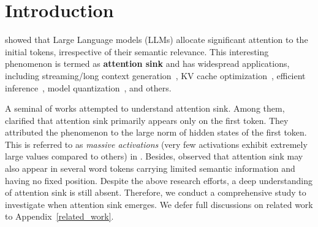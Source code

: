 \section{Introduction}



\citet{xiao2023efficient} showed that Large Language models (LLMs) allocate significant attention to the initial tokens, irrespective of their semantic relevance. This interesting phenomenon is termed as \textbf{attention sink} and has widespread applications, including streaming/long context generation~\citep{xiao2023efficient,han2024lm,yang2024seed}, KV cache optimization~\citep{ge2023model,wan2024look,wu2024layer}, efficient inference~\citep{zhang2024q,chen2024image}, model quantization~\citep{liu2024intactkv,huang2024slim}, and others.


A seminal of works attempted to understand attention sink. Among them, \citet{cancedda2024spectral} clarified that attention sink primarily appears only on the first token. They attributed the phenomenon to the large norm of hidden states of the first token. This is referred to as \textit{massive activations} (very few activations exhibit extremely large values compared to others) in \citet{sun2024massive}. Besides, \citet{sun2024massive,yu2024unveiling} observed that attention sink may also appear in several word tokens carrying limited semantic information and having no fixed position. Despite the above research efforts, a deep understanding of attention sink is still absent. Therefore, we conduct a comprehensive study to investigate when attention sink emerges. We defer full discussions on related work to Appendix~\ref{related_work}.


